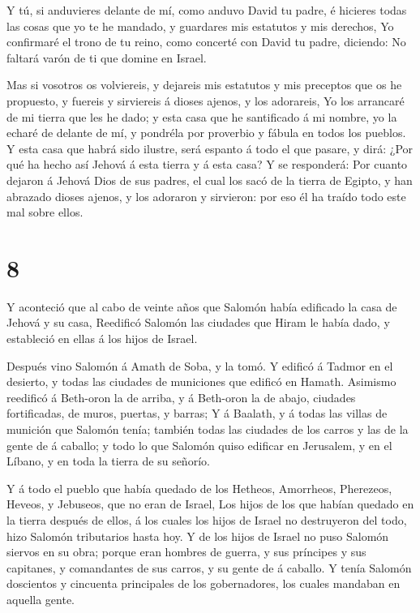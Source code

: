  Y tú, si anduvieres delante de mí, como anduvo David tu
padre, é hicieres todas las cosas que yo te he mandado, y guardares mis
estatutos y mis derechos,  Yo confirmaré el trono de tu
reino, como concerté con David tu padre, diciendo: No faltará varón de
ti que domine en Israel.

 Mas si vosotros os volviereis, y dejareis mis estatutos y
mis preceptos que os he propuesto, y fuereis y sirviereis á dioses
ajenos, y los adorareis,  Yo los arrancaré de mi tierra que
les he dado; y esta casa que he santificado á mi nombre, yo la echaré de
delante de mí, y pondréla por proverbio y fábula en todos los pueblos.
 Y esta casa que habrá sido ilustre, será espanto á todo el
que pasare, y dirá: ¿Por qué ha hecho así Jehová á esta tierra y á esta
casa?  Y se responderá: Por cuanto dejaron á Jehová Dios de
sus padres, el cual los sacó de la tierra de Egipto, y han abrazado
dioses ajenos, y los adoraron y sirvieron: por eso él ha traído todo
este mal sobre ellos.

\hypertarget{section-7}{%
\section{8}\label{section-7}}

 Y aconteció que al cabo de veinte años que Salomón había
edificado la casa de Jehová y su casa,  Reedificó Salomón
las ciudades que Hiram le había dado, y estableció en ellas á los hijos
de Israel.

 Después vino Salomón á Amath de Soba, y la tomó.
 Y edificó á Tadmor en el desierto, y todas las ciudades de
municiones que edificó en Hamath.  Asimismo reedificó á
Beth-oron la de arriba, y á Beth-oron la de abajo, ciudades
fortificadas, de muros, puertas, y barras;  Y á Baalath, y á
todas las villas de munición que Salomón tenía; también todas las
ciudades de los carros y las de la gente de á caballo; y todo lo que
Salomón quiso edificar en Jerusalem, y en el Líbano, y en toda la tierra
de su señorío.

 Y á todo el pueblo que había quedado de los Hetheos,
Amorrheos, Pherezeos, Heveos, y Jebuseos, que no eran de Israel,
 Los hijos de los que habían quedado en la tierra después de
ellos, á los cuales los hijos de Israel no destruyeron del todo, hizo
Salomón tributarios hasta hoy.  Y de los hijos de Israel no
puso Salomón siervos en su obra; porque eran hombres de guerra, y sus
príncipes y sus capitanes, y comandantes de sus carros, y su gente de á
caballo.  Y tenía Salomón doscientos y cincuenta
principales de los gobernadores, los cuales mandaban en aquella gente.

